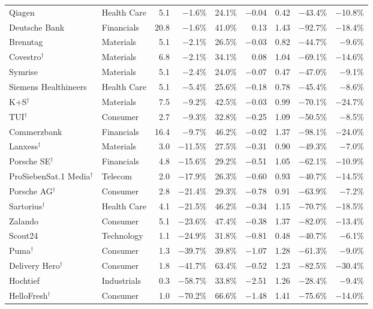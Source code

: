 \begin{longtable}{llrrrrrrr}
Qiagen & Health Care & 5.1 & $-$1.6\% & 24.1\% & $-$0.04 & 0.42 & $-$43.4\% & $-$10.8\% \\
Deutsche Bank & Financials & 20.8 & $-$1.6\% & 41.0\% & 0.13 & 1.43 & $-$92.7\% & $-$18.4\% \\
Brenntag & Materials & 5.1 & $-$2.1\% & 26.5\% & $-$0.03 & 0.82 & $-$44.7\% & $-$9.6\% \\
Covestro$^{\dagger}$ & Materials & 6.8 & $-$2.1\% & 34.1\% & 0.08 & 1.04 & $-$69.1\% & $-$14.6\% \\
Symrise & Materials & 5.1 & $-$2.4\% & 24.0\% & $-$0.07 & 0.47 & $-$47.0\% & $-$9.1\% \\
Siemens Healthineers & Health Care & 5.1 & $-$5.4\% & 25.6\% & $-$0.18 & 0.78 & $-$45.4\% & $-$8.6\% \\
K+S$^{\dagger}$ & Materials & 7.5 & $-$9.2\% & 42.5\% & $-$0.03 & 0.99 & $-$70.1\% & $-$24.7\% \\
TUI$^{\dagger}$ & Consumer & 2.7 & $-$9.3\% & 32.8\% & $-$0.25 & 1.09 & $-$50.5\% & $-$8.5\% \\
Commerzbank & Financials & 16.4 & $-$9.7\% & 46.2\% & $-$0.02 & 1.37 & $-$98.1\% & $-$24.0\% \\
Lanxess$^{\dagger}$ & Materials & 3.0 & $-$11.5\% & 27.5\% & $-$0.31 & 0.90 & $-$49.3\% & $-$7.0\% \\
Porsche SE$^{\dagger}$ & Financials & 4.8 & $-$15.6\% & 29.2\% & $-$0.51 & 1.05 & $-$62.1\% & $-$10.9\% \\
ProSiebenSat.1 Media$^{\dagger}$ & Telecom & 2.0 & $-$17.9\% & 26.3\% & $-$0.60 & 0.93 & $-$40.7\% & $-$14.5\% \\
Porsche AG$^{\dagger}$ & Consumer & 2.8 & $-$21.4\% & 29.3\% & $-$0.78 & 0.91 & $-$63.9\% & $-$7.2\% \\
Sartorius$^{\dagger}$ & Health Care & 4.1 & $-$21.5\% & 46.2\% & $-$0.34 & 1.15 & $-$70.7\% & $-$18.5\% \\
Zalando & Consumer & 5.1 & $-$23.6\% & 47.4\% & $-$0.38 & 1.37 & $-$82.0\% & $-$13.4\% \\
Scout24 & Technology & 1.1 & $-$24.9\% & 31.8\% & $-$0.81 & 0.48 & $-$40.7\% & $-$6.1\% \\
Puma$^{\dagger}$ & Consumer & 1.3 & $-$39.7\% & 39.8\% & $-$1.07 & 1.28 & $-$61.3\% & $-$9.0\% \\
Delivery Hero$^{\dagger}$ & Consumer & 1.8 & $-$41.7\% & 63.4\% & $-$0.52 & 1.23 & $-$82.5\% & $-$30.4\% \\
Hochtief & Industrials & 0.3 & $-$58.7\% & 33.8\% & $-$2.51 & 1.26 & $-$28.4\% & $-$9.4\% \\
HelloFresh$^{\dagger}$ & Consumer & 1.0 & $-$70.2\% & 66.6\% & $-$1.48 & 1.41 & $-$75.6\% & $-$14.0\% \\
\end{longtable}
